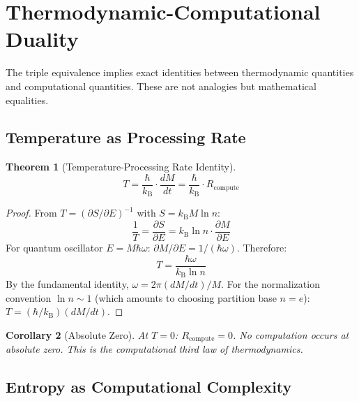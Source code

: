 \documentclass[11pt,twocolumn,a4paper]{article}
\newtheorem{theorem}{Theorem}[section]
\newtheorem{corollary}[theorem]{Corollary}
\theoremstyle{definition}
\theoremstyle{remark}
\newcommand{\kB}{k_{\mathrm{B}}}
\begin{document}
\section{Thermodynamic-Computational Duality}
\label{sec:thermo_comp}

The triple equivalence implies exact identities between thermodynamic quantities and computational quantities. These are not analogies but mathematical equalities.

\subsection{Temperature as Processing Rate}

\begin{theorem}[Temperature-Processing Rate Identity]
\label{thm:temperature}
\begin{equation}
T = \frac{\hbar}{\kB} \cdot \frac{dM}{dt} = \frac{\hbar}{\kB} \cdot R_{\mathrm{compute}}
\label{eq:temp_rate}
\end{equation}
\end{theorem}

\begin{proof}
From $T = (\partial S / \partial E)^{-1}$ with $S = \kB M \ln n$:
\begin{equation}
\frac{1}{T} = \frac{\partial S}{\partial E} = \kB \ln n \cdot \frac{\partial M}{\partial E}
\end{equation}
For quantum oscillator $E = M \hbar \omega$: $\partial M / \partial E = 1/(\hbar \omega)$. Therefore:
\begin{equation}
T = \frac{\hbar \omega}{\kB \ln n}
\end{equation}
By the fundamental identity, $\omega = 2\pi (dM/dt)/M$. For the normalization convention $\ln n \sim 1$ (which amounts to choosing partition base $n = e$): $T = (\hbar/\kB)(dM/dt)$.
\end{proof}

\begin{corollary}[Absolute Zero]
At $T = 0$: $R_{\mathrm{compute}} = 0$. No computation occurs at absolute zero. This is the computational third law of thermodynamics.
\end{corollary}

\subsection{Entropy as Computational Complexity}
\end{document}
